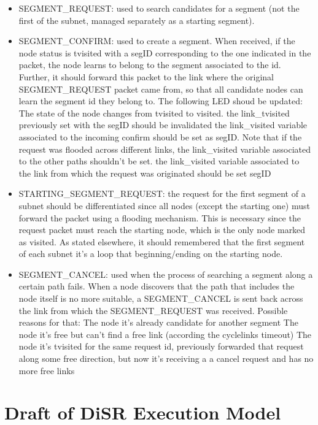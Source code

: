 \documentclass[final,journal,letterpaper]{IEEEtran}
\begin{document}
\begin{itemize}
\item{SEGMENT\_REQUEST}: used to search candidates for a segment (not the
first of the subnet, managed separately as a starting segment).

\item{SEGMENT\_CONFIRM}: used to create a segment. When received, if the node
status is tvisited with a segID corresponding to the one indicated in
the packet, the node learns to belong to the segment associated to the
id. Further, it should forward this packet to the link where the
original SEGMENT\_REQUEST packet came from, so that all candidate nodes
can learn the segment id they belong to. The following LED shoud be
updated: The state of the node changes from tvisited to visited.  the
link\_tvisited previously set with the segID should be invalidated the
link\_visited variable associated to the incoming confirm should be set
as segID. Note that if the request was flooded across different links,
the link\_visited variable associated to the other paths shouldn’t be
set.  the link\_visited variable associated to the link from which the
request was originated should be set segID

\item{STARTING\_SEGMENT\_REQUEST}: the request for the first segment of a
subnet should be differentiated since all nodes (except the starting
one) must forward the packet using a flooding mechanism. This is
necessary since the request packet must reach the starting node, which
is the only node marked as visited. As stated elsewhere, it should
remembered that the first segment of each subnet it's  a loop that
beginning/ending on the starting node.


\item{SEGMENT\_CANCEL}: used when the process of searching a segment along a
certain path fails. When a node discovers that the path that includes
the node itself is no more suitable, a SEGMENT\_CANCEL is sent back
across the link from which the SEGMENT\_REQUEST was received.  Possible
reasons for that: The node it’s already candidate for another segment
The node it’s free but can’t find a free link (according the
cyclelinks timeout) The node it’s tvisited for the same request id,
previously forwarded that request along some free direction, but now
it’s receiving a a cancel request and has no more free links

\end{itemize}

\section{Draft of DiSR Execution Model}
\end{document}
